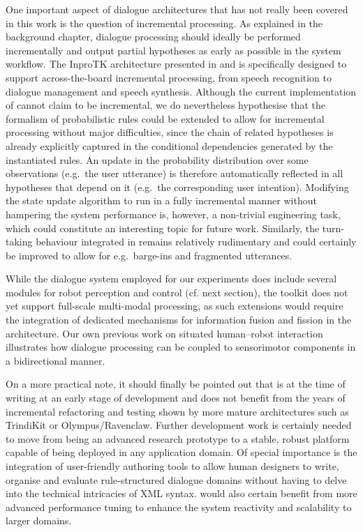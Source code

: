 One important aspect of dialogue architectures that has not really been covered in this work is the question of incremental processing.  As explained in the background chapter, dialogue processing should ideally be performed incrementally and output partial hypotheses as early as possible in the system workflow. The InproTK architecture presented in \cite{schlangen2009general} and \cite{Baumann:2012} is specifically designed to support across-the-board incremental processing, from speech recognition to dialogue management and speech synthesis. Although the current implementation of \opendial{} cannot claim to be incremental, we do nevertheless hypothesise that the formalism of probabilistic rules could be extended to allow for incremental processing without major difficulties, since the chain of related hypotheses is already explicitly captured in the conditional dependencies generated by the instantiated rules.  An update in the probability distribution over some observations (e.g.\ the user utterance) is therefore automatically reflected in all hypotheses that depend on it (e.g.\ the corresponding user intention). Modifying the state update algorithm to run in a fully incremental manner without hampering the system performance is, however, a non-trivial engineering task, which could constitute an interesting topic for future work. Similarly, the turn-taking behaviour integrated in \opendial{} remains relatively rudimentary and could certainly be improved to allow for e.g.\ barge-ins and fragmented utterances.

While the dialogue system employed for our experiments does include several modules for robot perception and control (cf. next section), the toolkit does not yet support full-scale multi-modal processing, as such extensions would require the integration of dedicated mechanisms for information fusion and fission in the architecture. Our own previous work on situated human--robot interaction \citep{cosybook:dialogue} illustrates how dialogue processing can be coupled to sensorimotor components in a bidirectional manner.  

On a more practical note, it should finally be pointed out that \opendial{} is at the time of writing at an early stage of development and does not benefit from the years of incremental refactoring and testing shown by more mature architectures such as TrindiKit or Olympus/Ravenclaw. Further development work is certainly needed to move \opendial{} from being an advanced research prototype to a stable, robust platform capable of being deployed in any application domain. Of special importance is the integration of user-friendly authoring tools to allow human designers to write, organise and evaluate rule-structured dialogue domains without having to delve into the technical intricacies of XML syntax. \opendial{} would also certain benefit from more advanced performance tuning to enhance the system reactivity and scalability to larger domains. 


